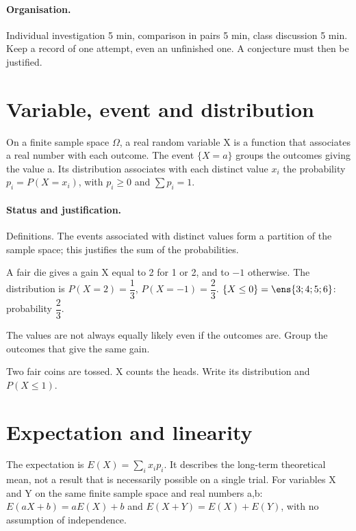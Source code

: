 \paragraph{Organisation.} Individual investigation 5 min, comparison in pairs 5 min, class discussion 5 min. Keep a record of one attempt, even an unfinished one. A conjecture must then be justified.
\mxnewpage
\section{Variable, event and distribution}\label{C08-U1}
\begin{keypoint}
On a finite sample space $\Omega$, a real random variable X is a function that associates a real number with each outcome. The event $\{X=a\}$ groups the outcomes giving the value a. Its distribution associates with each distinct value $x_i$ the probability $p_i=P(X=x_i)$, with $p_i\geq0$ and $\sum p_i=1$.
\end{keypoint}
\paragraph{Status and justification.} Definitions. The events associated with distinct values form a partition of the sample space; this justifies the sum of the probabilities.
\begin{example}A fair die gives a gain X equal to 2 for 1 or 2, and to $-1$ otherwise. The distribution is $P(X=2)=\dfrac{1}{3}$, $P(X=-1)=\dfrac{2}{3}$. $\{X\leq0\}=\ens{3;4;5;6}$: probability $\dfrac{2}{3}$.\end{example}\label{C08-EX1}
\begin{pitfall}The values are not always equally likely even if the outcomes are. Group the outcomes that give the same gain.\end{pitfall}
\begin{application}Two fair coins are tossed. X counts the heads. Write its distribution and $P(X\leq1)$.\end{application}\label{C08-AP1}
\section{Expectation and linearity}\label{C08-U2}
\begin{keypoint}
The expectation is $E(X)=\sum_i x_ip_i$. It describes the long-term theoretical mean, not a result that is necessarily possible on a single trial. For variables X and Y on the same finite sample space and real numbers a,b: $E(aX+b)=aE(X)+b$ and $E(X+Y)=E(X)+E(Y)$, with no assumption of independence.
\end{keypoint}
